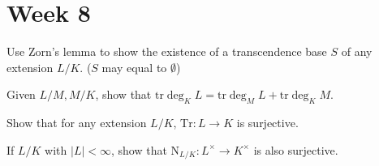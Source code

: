 
\section{Week 8}

\begin{exercise} 
  Use Zorn's lemma to show the existence of a transcendence base $S$ of any 
  extension $L/K$. ($S$ may equal to $\emptyset$)
\end{exercise}

\begin{exercise}
  Given $L/M, M/K$, show that $\mathrm{tr} \deg_K L = \mathrm{tr} \deg_M L
  + \mathrm{tr} \deg_K M$.
\end{exercise}

\begin{exercise}
  Show that for any extension $L/K$, $\mathrm{Tr} : L \to K$ is surjective.
\end{exercise}

\begin{exercise}
  If $L/K$ with $|L| < \infty$, show that $\mathrm{N}_{L/K} : L^\times \to K^\times$
  is also surjective.
\end{exercise}
